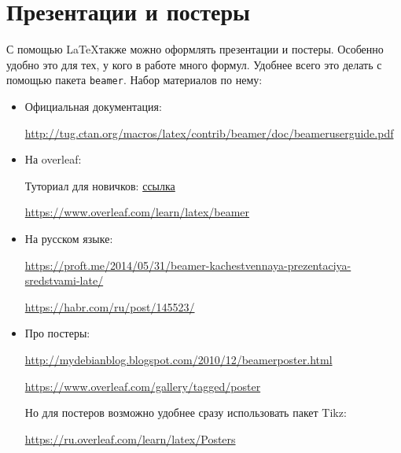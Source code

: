 \section{Презентации и постеры}

С помощью \LaTeX также можно оформлять презентации и постеры. Особенно удобно это для тех, у кого в работе много формул. Удобнее всего это делать с помощью пакета \verb*|beamer|. Набор материалов по нему:
\begin{itemize}
	\item Официальная документация:
	
	 \href{http://tug.ctan.org/macros/latex/contrib/beamer/doc/beameruserguide.pdf}{\small http://tug.ctan.org/macros/latex/contrib/beamer/doc/beameruserguide.pdf} 
	 \item На overleaf:
	 
	 Туториал для новичков: \href{https://www.overleaf.com/learn/latex/Beamer_Presentations:_A_Tutorial_for_Beginners_(Part_1)%E2%80%94Getting_Started}{ссылка} 
	 	
	 \href{https://www.overleaf.com/learn/latex/beamer}{https://www.overleaf.com/learn/latex/beamer}
	 \item На русском языке:
	  
	  \href{https://proft.me/2014/05/31/beamer-kachestvennaya-prezentaciya-sredstvami-late/}{\small https://proft.me/2014/05/31/beamer-kachestvennaya-prezentaciya-sredstvami-late/}
	  
	  \href{https://habr.com/ru/post/145523/}{https://habr.com/ru/post/145523/}
	  \item Про постеры:
	  
	  \href{http://mydebianblog.blogspot.com/2010/12/beamerposter.html}{http://mydebianblog.blogspot.com/2010/12/beamerposter.html}
	  
	  \href{https://www.overleaf.com/gallery/tagged/poster}{https://www.overleaf.com/gallery/tagged/poster}
	  
	  Но для постеров возможно удобнее сразу использовать пакет Tikz:
	  
	  \href{https://ru.overleaf.com/learn/latex/Posters}{https://ru.overleaf.com/learn/latex/Posters}
\end{itemize}


